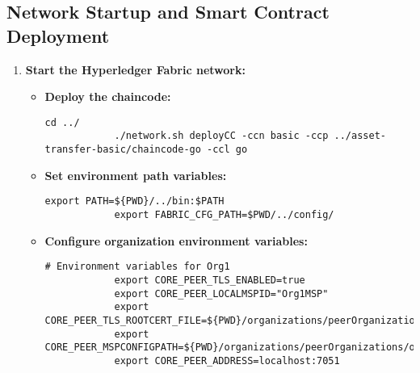 \subsection{Network Startup and Smart Contract Deployment}
\begin{enumerate}
	\item \textbf{Start the Hyperledger Fabric network:}
	\begin{itemize}
		\begin{lstlisting}[style=appendixstyle, caption={Start Fabric Network}, label={lst:start-network}]
			sudo docker-compose -f compose-test-net.yaml start
		\end{lstlisting}
		
		\item \textbf{Deploy the chaincode:}
		\begin{lstlisting}[style=appendixstyle, caption={Deploy Chaincode}, label={lst:deploy-chaincode}]
			cd ../
			./network.sh deployCC -ccn basic -ccp ../asset-transfer-basic/chaincode-go -ccl go
		\end{lstlisting}
		
		\item \textbf{Set environment path variables:}
		\begin{lstlisting}[style=appendixstyle, caption={Path Environment Variables}, label={lst:path-vars}]
			export PATH=${PWD}/../bin:$PATH
			export FABRIC_CFG_PATH=$PWD/../config/
		\end{lstlisting}
	
	\item \textbf{Configure organization environment variables:}
	\begin{lstlisting}[style=appendixstyle, caption={Org1 Environment Configuration}, label={lst:org-vars}]
			# Environment variables for Org1
			export CORE_PEER_TLS_ENABLED=true
			export CORE_PEER_LOCALMSPID="Org1MSP"
			export CORE_PEER_TLS_ROOTCERT_FILE=${PWD}/organizations/peerOrganizations/org1.example.com/peers/peer0.org1.example.com/tls/ca.crt
			export CORE_PEER_MSPCONFIGPATH=${PWD}/organizations/peerOrganizations/org1.example.com/users/Admin@org1.example.com/msp
			export CORE_PEER_ADDRESS=localhost:7051
	
	\end{lstlisting}
	\end{itemize}
\end{enumerate}
